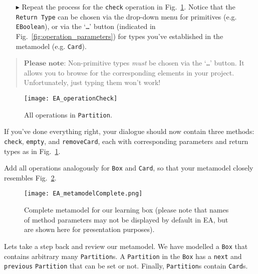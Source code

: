 \begin{enumerate}
\item[$\blacktriangleright$] Repeat the process for the \texttt{check} operation in Fig.~\ref{fig:operation_partition}.
Notice that the \texttt{Return Type} can be chosen via the drop-down menu for primitives (e.g. \texttt{EBoolean}), or via the `\texttt{\ldots}' button (indicated in Fig.~\ref{fig:operation_parameters}) for types you've established in the metamodel (e.g. \texttt{Card}).
\end{enumerate}

\vspace{-.5cm}
\begin{quote}
$\textbf{Please note:}$ Non-primitive types \emph{must} be chosen via the `\texttt{\ldots}' button. It allows you to browse for the corresponding elements in your project. Unfortunately, just typing them won't work!
\end{quote}
\vspace{-.5cm}

\pagebreak

\begin{figure}[htbp]
	\centering
  \texttt{[image: EA\_operationCheck]}
	\caption{All operations in \texttt{Partition}.}
	\label{fig:operation_partition}
\end{figure}

If you've done everything right, your dialogue should now contain three methods: \texttt{check}, \texttt{empty}, and \texttt{removeCard}, each with corresponding parameters and return types as in Fig.~\ref{fig:operation_partition}.

Add all operations analogously for \texttt{Box} and \texttt{Card}, so that your metamodel closely resembles Fig.~\ref{fig:metamodel_complete}.

\begin{figure}[htbp]
	\centering
  \texttt{[image: EA\_metamodelComplete.png]}
	\caption[Complete metamodel for our learning box.]{Complete metamodel for our learning box (please note that names of method parameters may not be displayed by default in EA, but are shown here for presentation purposes).}
	\label{fig:metamodel_complete}
\end{figure}

Lets take a step back and review our metamodel.
We have modelled a \texttt{Box} that contains arbitrary many \texttt{Partition}s.
A \texttt{Partition} in the \texttt{Box} has a \texttt{next} and \texttt{previous} \texttt{Partition} that can be set or not. Finally, \texttt{Partition}s contain \texttt{Card}s.

